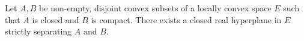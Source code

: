 Let $A, B$ be non-empty, disjoint convex subsets of a locally convex space $E$ such that $A$ is closed and $B$ is compact. There exists a closed real hyperplane in $E$ strictly separating $A$ and $B$.

